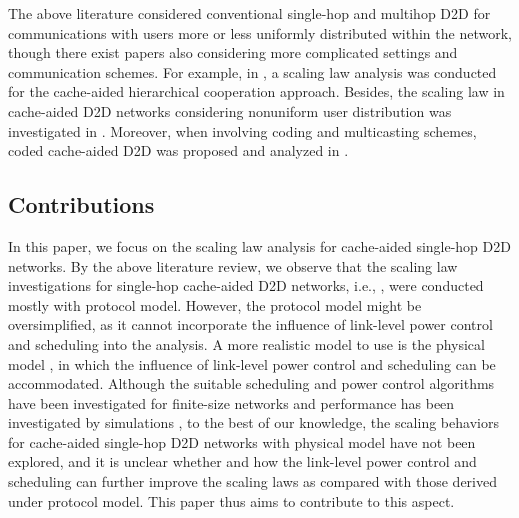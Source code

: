 \documentclass[journal,draftclsnofoot,onecolumn,12pt,twoside]{IEEEtran}
\begin{document}
The above literature considered conventional single-hop and multihop D2D for communications with users more or less uniformly distributed within the network, though there exist papers also considering more complicated settings and communication schemes. For example, in \cite{guo2017achievable}, a scaling law analysis was conducted for the cache-aided hierarchical cooperation approach. Besides, the scaling law in cache-aided D2D networks considering nonuniform user distribution was investigated in \cite{ren2021scaling}. Moreover, when involving coding and multicasting schemes, coded cache-aided D2D was proposed and analyzed in \cite{ji2017fundamental,Ji:Fund_D2D,naderializadeh2017fundamental,yapar2019optimality,zhang2021cache}.

\subsection{Contributions}

In this paper, we focus on the scaling law analysis for cache-aided single-hop D2D networks. By the above literature review, we observe that the scaling law investigations for single-hop cache-aided D2D networks, i.e., \cite{Golrezaei:Cach_scale,Ji:Th_Out_toff,lee2019throughput}, were conducted mostly with protocol model. However, the protocol model might be oversimplified, as it cannot incorporate the influence of link-level power control and scheduling into the analysis. A more realistic model to use is the physical model \cite{agarwal2004capacity}, in which the influence of link-level power control and scheduling can be accommodated. Although the suitable scheduling and power control algorithms have been investigated for finite-size networks and performance has been investigated by simulations \cite{Zhang:D2D_Schedule,chen2017optimal,lee2018cachingTWC,choi2020joint}, to the best of our knowledge, the scaling behaviors for cache-aided single-hop D2D networks with physical model have not been explored, and it is unclear whether and how the link-level power control and scheduling can further improve the scaling laws as compared with those derived under protocol model. This paper thus aims to contribute to this aspect.
\end{document}
